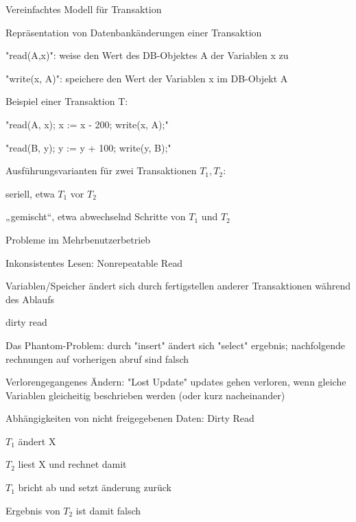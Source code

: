 \documentclass[a4paper]{article}
\begin{document}
\begin{multicols}{3}
\begin{itemize*}
        Vereinfachtes Modell für Transaktion
        \begin{itemize*}
            \item Repräsentation von Datenbankänderungen einer Transaktion
            \begin{itemize*}
                \item "read(A,x)": weise den Wert des DB-Objektes A der Variablen x zu
                \item "write(x, A)": speichere den Wert der Variablen x im DB-Objekt A
            \end{itemize*}
            \item Beispiel einer Transaktion T:
            \begin{itemize*}
                \item "read(A, x); x := x - 200; write(x, A);"
                \item "read(B, y); y := y + 100; write(y, B);"
            \end{itemize*}
            \item Ausführungsvarianten für zwei Transaktionen $T_1 , T_2$:
            \begin{itemize*}
                \item seriell, etwa $T_1$ vor $T_2$
                \item „gemischt“, etwa abwechselnd Schritte von $T_1$ und $T_2$
            \end{itemize*}
            \item Probleme im Mehrbenutzerbetrieb
            \begin{itemize*}
                \item Inkonsistentes Lesen: Nonrepeatable Read
                \item Variablen/Speicher ändert sich durch fertigstellen anderer Transaktionen während des Ablaufs
                \item dirty read
                \item Das Phantom-Problem: durch "insert" ändert sich "select" ergebnis; nachfolgende rechnungen auf vorherigen abruf sind falsch
                \item Verlorengegangenes Ändern: "Lost Update" updates gehen verloren, wenn gleiche Variablen gleicheitig beschrieben werden (oder kurz nacheinander)
            \end{itemize*}
        \end{itemize*}

        Abhängigkeiten von nicht freigegebenen Daten: Dirty Read
        \begin{itemize*}
            \item $T_1$ ändert X
            \item $T_2$ liest X und rechnet damit
            \item $T_1$ bricht ab und setzt änderung zurück
            \item Ergebnis von $T_2$ ist damit falsch
        \end{itemize*}


\end{itemize*}
\end{multicols}
\end{document}
